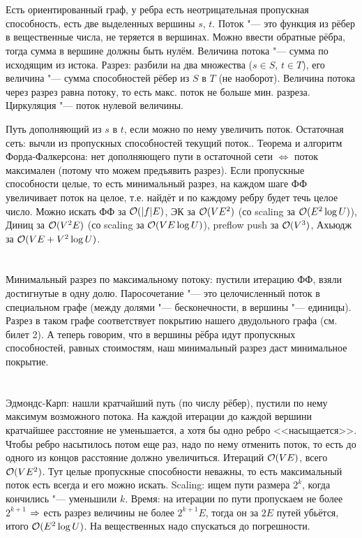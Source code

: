 \section{} %
Есть ориентированный граф, у ребра есть неотрицательная пропускная способность, есть две выделенных вершины $s$, $t$.
Поток "--- это функция из рёбер в вещественные числа, не теряется в вершинах.
Можно ввести обратные рёбра, тогда сумма в вершине должны быть нулём.
Величина потока "--- сумма по исходящим из истока.
Разрез: разбили на два множества ($s \in S$, $t\in T$), его величина "--- сумма способностей рёбер из $S$ в $T$ (не наоборот).
Величина потока через разрез равна потоку, то есть макс. поток не больше мин. разреза.
Циркуляция "--- поток нулевой величины.

Путь дополняющий из $s$ в $t$, если можно по нему увеличить поток.
Остаточная сеть: вычли из пропускных способностей текущий поток..
Теорема и алгоритм Форда-Фалкерсона: нет дополняющего пути в остаточной сети $\iff$ поток максимален (потому что можем предъявить разрез).
Если пропускные способности целые, то есть минимальный разрез, на каждом шаге ФФ увеличивает поток на целое, т.е. найдёт и по каждому ребру будет течь целое число.
Можно искать ФФ за $\mathcal{O}(|f|E)$, ЭК за $\mathcal{O}(VE^2)$ (со scaling за $\mathcal{O}(E^2 \log U)$), Диниц за $\mathcal{O}(V^2E)$ (со scaling за $\mathcal{O}(VE\log U)$), preflow push за $\mathcal{O}(V^3)$,
Ахьюдж за $\mathcal{O}(VE + V^2\log U)$.

\section{} %
Минимальный разрез по максимальному потоку: пустили итерацию ФФ, взяли достигнутые в одну долю.
Паросочетание "--- это целочисленный поток в специальном графе (между долями "--- бесконечности, в вершины "--- единицы).
Разрез в таком графе соответствует покрытию нашего двудольного графа (см. билет 2).
А теперь говорим, что в вершины рёбра идут пропускных способностей, равных стоимостям, наш минимальный разрез даст минимальное покрытие.

\section{} %
Эдмондс-Карп: нашли кратчайший путь (по числу рёбер), пустили по нему максимум возможного потока.
На каждой итерации до каждой вершини кратчайшее расстояние не уменьшается, а хотя бы одно ребро <<насыщается>>.
Чтобы ребро насытилось потом еще раз, надо по нему отменить поток, то есть до одного из концов расстояние должно увеличиться.
Итераций $\mathcal{O}(VE)$, всего $\mathcal{O}(VE^2)$.
Тут целые пропускные способности неважны, то есть максимальный поток есть всегда и его можно искать.
Scaling: ищем пути размера $2^k$, когда кончились "--- уменьшили $k$.
Время: на итерации по пути пропускаем не более $2^{k+1}$ $\Rightarrow$ есть разрез величины не более $2^{k+1}E$, тогда он за $2E$ путей убьётся, итого $\mathcal{O}(E^2 \log U)$.
На вещественных надо спускаться до погрешности.

